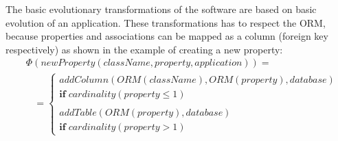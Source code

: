 \documentclass[runningheads]{comsis}
\begin{document}
The basic evolutionary transformations of the software are based on basic evolution of an application. These transformations has to respect the ORM, because properties and associations can be mapped as a column (foreign key respectively) as shown in the example of creating a new property: 
\begin{align}
& \Phi(newProperty(className, property, application)) = \nonumber \\
& \;\;\; =  \begin{cases}
  addColumn(ORM(className), ORM(property), database) \\\mathbf{if} \; cardinality(property \leq 1)  \\\\
  addTable(ORM(property), database) \\
  \mathbf{if} \; cardinality(property > 1)  
   \end{cases}
\end{align}
\end{document}
